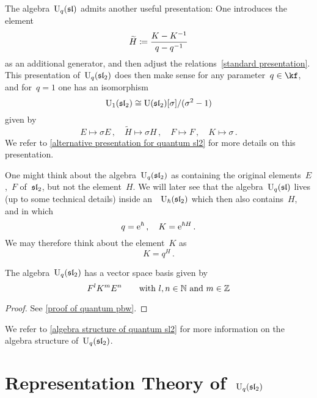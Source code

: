 \documentclass[a4paper, 11pt, oneside]{scrartcl}
\begin{document}
\begin{remark}[The case~$q = 1$]
  \label{quantum U1}
  The algebra~$\operatorname{U}_q(\mathfrak{sl})$ admits another useful presentation:
  One introduces the element
  \[
    \widetilde{H}
    \coloneqq
    \frac{K - K^{-1}}{q - q^{-1}}
  \]
  as an additional generator, and then adjust the relations~\eqref{standard presentation}.
  This presentation of~$\operatorname{U}_q(\mathfrak{sl}_2)$ does then make sense for any parameter~$q \in \kf$, and for~$q = 1$ one has an isomorphism
  \[
    \operatorname{U}_1(\mathfrak{sl}_2)
    \cong
    \operatorname{U}(\mathfrak{sl}_2)[\sigma]/(\sigma^2 - 1)
  \]
  given by
  \begin{equation}
    \label{isomorphism for U1}
    E \mapsto \sigma E \,,
    \quad
    \widetilde{H} \mapsto \sigma H \,,
    \quad
    F \mapsto F \,,
    \quad
    K \mapsto \sigma \,.
  \end{equation}
  We refer to \cref{alternative presentation for quantum sl2} for more details on this presentation.
\end{remark}

\begin{remark}
  One might think about the algebra~$\operatorname{U}_q(\mathfrak{sl}_2)$ as containing the original elements~$E$,~$F$ of~$\mathfrak{sl}_2$, but not the element~$H$.
  We will later see that the algebra~$\operatorname{U}_q(\mathfrak{sl})$ lives (up to some technical details) inside an~\algebra{$\kfhbar$}~$\operatorname{U}_{\hbar}(\mathfrak{sl}_2)$ which then also contains~$H$, and in which
  \[
    q = \mathrm{e}^{\hbar} \,,
    \quad
    K = \mathrm{e}^{\hbar H} \,.
  \]
  We may therefore think about the element~$K$ as
  \[
    K
    =
    q^H \,.
  \]
\end{remark}

\begin{theorem}
  \label{quantum pbw}
  The algebra~$\operatorname{U}_q(\mathfrak{sl}_2)$ has a vector space basis given by
  \[
    F^l K^m E^n
    \qquad
    \text{with~$l, n \in \mathbb{N}$ and~$m \in \mathbb{Z}$} 
  \]
\end{theorem}

\begin{proof}
  See \cref{proof of quantum pbw}.
\end{proof}

We refer to \cref{algebra structure of quantum sl2} for more information on the algebra structure of~$\operatorname{U}_q(\mathfrak{sl}_2)$.





\section{Representation Theory of~\texorpdfstring{$\operatorname{U}_q(\mathfrak{sl}_2)$}{Uq(sl2)}}
\end{document}
